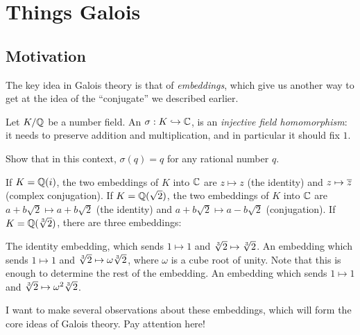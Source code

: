 \chapter{Things Galois}

\section{Motivation}
The key idea in Galois theory is that of \emph{embeddings},
which give us another way to get at the idea of the ``conjugate'' we described earlier.

Let $K/\mathbb Q$ be a number field.
An  $\sigma : K \hookrightarrow \mathbb C$, is an \emph{injective field homomorphism}:
it needs to preserve addition and multiplication,
and in particular it should fix $1$.
\begin{ques}
	Show that in this context, $\sigma(q) = q$ for any rational number $q$.
\end{ques}

\begin{example}
	\listhack
	\begin{enumerate}[(a)]
		\ii If $K = \mathbb Q(i)$, the two embeddings of $K$ into $\mathbb C$ are
		$z \mapsto z$ (the identity) and $z \mapsto \overline z$ (complex conjugation).
		\ii If $K = \mathbb Q(\sqrt 2)$, the two embeddings of $K$ into $\mathbb C$ are
		$a+b\sqrt 2 \mapsto a+b\sqrt 2$ (the identity) and $a+b\sqrt 2 \mapsto a-b\sqrt 2$ (conjugation).
		\ii If $K = \mathbb Q(\sqrt[3]{2})$, there are three embeddings:
		\begin{itemize}
			\ii The identity embedding, which sends $1 \mapsto 1$ and $\sqrt[3]{2} \mapsto \sqrt[3]{2}$.
			\ii An embedding which sends $1 \mapsto 1$ and $\sqrt[3]{2} \mapsto \omega \sqrt[3]{2}$,
			where $\omega$ is a cube root of unity.
			Note that this is enough to determine the rest of the embedding.
			\ii An embedding which sends $1 \mapsto 1$ and $\sqrt[3]{2} \mapsto \omega^2 \sqrt[3]{2}$.
		\end{itemize}
	\end{enumerate}
\end{example}

I want to make several observations about these embeddings,
which will form the core ideas of Galois theory.
Pay attention here!

